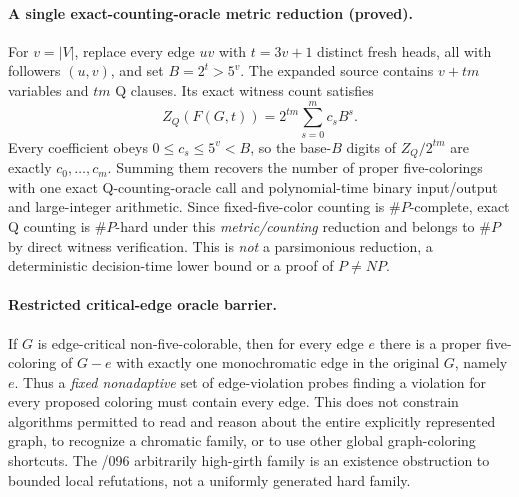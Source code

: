 \documentclass[11pt]{article}
\begin{document}
\paragraph{A single exact-counting-oracle metric reduction (proved).}
For $v=|V|$, replace every edge $uv$ with $t=3v+1$ distinct
fresh heads, all with followers $(u,v)$, and set $B=2^t>5^v$.
The expanded source contains $v+tm$ variables and $tm$ Q clauses.
Its exact witness count satisfies
\[
 \boxed{
 Z_Q(F(G,t))=2^{tm}\sum_{s=0}^{m} c_s B^s.
 }
\]
Every coefficient obeys $0\le c_s\le5^v<B$, so the
base-$B$ digits of $Z_Q/2^{tm}$ are exactly $c_0,\ldots,c_m$.
Summing them recovers the number of proper five-colorings
with one exact Q-counting-oracle call and polynomial-time
binary input/output and large-integer arithmetic. Since
fixed-five-color counting is $\#P$-complete, exact Q counting
is $\#P$-hard under this \emph{metric/counting} reduction
and belongs to $\#P$ by direct witness verification.
This is \emph{not} a parsimonious reduction, a deterministic
decision-time lower bound or a proof of $P\ne NP$.

\paragraph{Restricted critical-edge oracle barrier.}
If $G$ is edge-critical non-five-colorable, then for every edge
$e$ there is a proper five-coloring of $G-e$ with exactly one
monochromatic edge in the original $G$, namely $e$.
Thus a \emph{fixed nonadaptive} set of edge-violation probes
finding a violation for every proposed coloring must contain
every edge. This does not constrain algorithms permitted
to read and reason about the entire explicitly represented
graph, to recognize a chromatic family, or to use other
global graph-coloring shortcuts. The /096 arbitrarily
high-girth family is an existence obstruction to bounded
local refutations, not a uniformly generated hard family.
\end{document}

